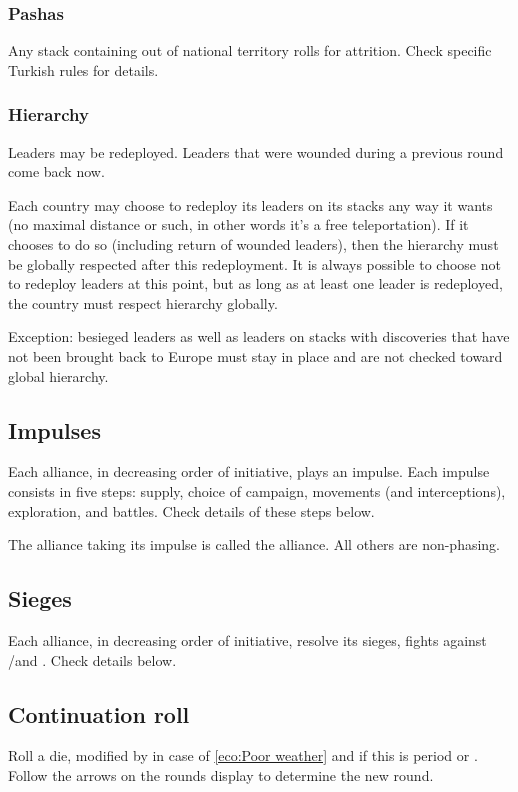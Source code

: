 \subsubsection{Pashas}
Any stack containing \Timar out of \TUR national territory rolls for
attrition. Check specific Turkish rules for details.

\subsubsection{Hierarchy}
Leaders may be redeployed. Leaders that were wounded during a previous round
come back now.

Each country may choose to redeploy its leaders on its stacks any way it wants
(no maximal distance or such, in other words it's a free teleportation). If it
chooses to do so (including return of wounded leaders), then the hierarchy
must be globally respected after this redeployment. It is always possible to
choose not to redeploy leaders at this point, but as long as at least one
leader is redeployed, the country must respect hierarchy globally.

Exception: besieged leaders as well as leaders on stacks with discoveries that
have not been brought back to Europe must stay in place and are not checked
toward global hierarchy.

\subsection{Impulses}
Each alliance, in decreasing order of initiative, plays an impulse. Each
impulse consists in five steps: supply, choice of campaign, movements (and
interceptions), exploration, and battles. Check details of these steps below.

The alliance taking its impulse is called the  alliance. All
others are non-phasing.

\subsection{Sieges}
Each alliance, in decreasing order of initiative, resolve its sieges, fights
against \REVOLT/\REBELLION and \corsaire. Check details below.

\subsection{Continuation roll}
\label{chMilitary:Rounds:Continuation roll}
Roll a die, modified by  in case of \ref{eco:Poor weather} and
 if this is period  or . Follow the arrows on
the rounds display to determine the new round.

